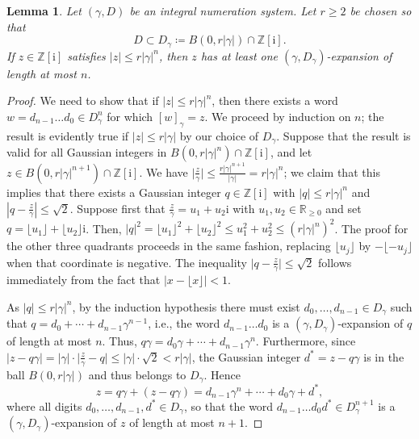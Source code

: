 \documentclass{amsart}
\newcommand{\Z}{\mathbb{Z}}
\newcommand{\R}{\mathbb{R}}
\newcommand{\ii}{\mathrm{i}}
\newtheorem*{main theorem}{Theorem \ref{thm:main-gaussian}}
\newtheorem{lemma}[theorem]{Lemma}
\theoremstyle{definition}
\begin{document}
\begin{lemma}\label{lem:small-numbers-have-short-expansions}
     Let $(\gamma, D)$ be an integral numeration  system. Let $r\geq 2$ be chosen so that 
     \begin{equation} \label{eq:expanded_digit_set}
        D\subset D_\gamma \coloneq B(0,r\lvert\gamma\rvert)\cap\Z[\ii].
    \end{equation}
If  $z\in\Z[\ii]$ satisfies
     $\lvert z\rvert \le r\lvert\gamma\rvert^n$, then  $z$ has at least one $(\gamma, D_\gamma)$-expansion of length at most $n$.
\end{lemma}
\begin{proof}
We need to show that if  $\lvert z\rvert \le r\lvert\gamma\rvert^n$, then there exists a word $w=d_{n-1}\dotsc d_{0}\in D_\gamma^n$ for which $[w]_\gamma = z$.
    We proceed by induction on $n$; the result is evidently true if $\lvert z\rvert\le r\lvert\gamma\rvert$ by our choice of $D_\gamma$. Suppose that the result is valid for all Gaussian integers in $ B(0,r\lvert \gamma\rvert^n)\cap\Z[\ii]$, and let $z\in B(0,r\lvert\gamma\rvert^{n+1})\cap\Z[\ii]$. We have $\lvert\frac{z}{\gamma}\rvert\le \frac{r\lvert\gamma\rvert^{n+1}}{\lvert\gamma\rvert}=r\lvert\gamma\rvert^n$; we claim that this implies that there exists a Gaussian integer $q\in\Z[\ii]$ with $|q|\leq r\lvert\gamma\rvert^n$ and
    $|q-\frac{z}{\gamma}|\leq 
    \sqrt{2}$.  Suppose first that $\frac{z}{\gamma}=u_1+u_2\ii$ with $u_1,u_2\in\R_{\ge 0}$ and set $q=\lfloor u_1\rfloor + \lfloor u_2\rfloor\ii$. Then, $\lvert q\rvert^2=\lfloor u_1\rfloor^2+\lfloor u_2\rfloor^2\le u_1^2+u_2^2\le (r\lvert\gamma\rvert^n)^2$.  The proof for the other three quadrants proceeds  
    in the same fashion, replacing $\lfloor u_j\rfloor$ by $-\lfloor -u_j\rfloor$ when that coordinate is negative. The inequality $\lvert q - \frac{z}{\gamma}\rvert \le\sqrt{2}$  follows immediately from the fact that $\lvert x-\lfloor x\rfloor\rvert <1$.%

    As $\lvert q\rvert\le r\lvert\gamma\rvert^n$, by the induction hypothesis there must exist $d_0,\dotsc,d_{n-1}\in D_\gamma$ such that $q=d_0+\cdots+d_{n-1}\gamma^{n-1}$, i.e., the word $d_{n-1}\dotsc d_0$ is a $(\gamma , D_\gamma)$-expansion of $q$ of length at most $n$. Thus, $q\gamma=d_0\gamma+\cdots+d_{n-1}\gamma^n$. Furthermore, since $\lvert z- q\gamma\rvert = \lvert \gamma \rvert \cdot \lvert \frac{z}{\gamma}-q\rvert  \le \lvert\gamma\rvert\cdot\sqrt{2}< r\lvert\gamma\rvert$, the Gaussian integer $d^*=z-q\gamma$ is in the ball $B(0,r\lvert\gamma\rvert)$ and thus belongs to $D_\gamma$. Hence
        \[z= q\gamma + (z-q\gamma)=d_{n-1}\gamma^n+\cdots+d_0\gamma+d^*, \]
    where all digits $d_0,\dotsc,d_{n-1},d^*\in D_\gamma$, so that  the word $d_{n-1}\dotsc d_0d^*\in D_\gamma^{n+1}$ is a $(\gamma, D_\gamma)$-expansion of $z$ of length
    at most $n+1$.
\end{proof}
\end{document}
